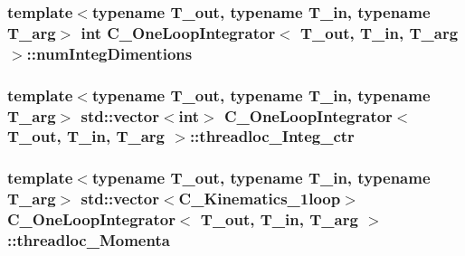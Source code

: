 \hypertarget{class_c___one_loop_integrator_aed8066a37eaa0865bd484ffd18884abb}{
\subsubsection[{num\-Integ\-Dimentions}]{\setlength{\rightskip}{0pt plus 5cm}template$<$typename T\-\_\-out, typename T\-\_\-in, typename T\-\_\-arg$>$ int {\bf C\-\_\-\-One\-Loop\-Integrator}$<$ T\-\_\-out, T\-\_\-in, T\-\_\-arg $>$\-::num\-Integ\-Dimentions\hspace{0.3cm}{\ttfamily [protected]}}}\label{class_c___one_loop_integrator_aed8066a37eaa0865bd484ffd18884abb}
\hypertarget{class_c___one_loop_integrator_a78ea7c4afee6c20ed50e6fa171a47dc3}{
\subsubsection[{threadloc\-\_\-\-Integ\-\_\-ctr}]{\setlength{\rightskip}{0pt plus 5cm}template$<$typename T\-\_\-out, typename T\-\_\-in, typename T\-\_\-arg$>$ std\-::vector$<$int$>$ {\bf C\-\_\-\-One\-Loop\-Integrator}$<$ T\-\_\-out, T\-\_\-in, T\-\_\-arg $>$\-::threadloc\-\_\-\-Integ\-\_\-ctr\hspace{0.3cm}{\ttfamily [protected]}}}\label{class_c___one_loop_integrator_a78ea7c4afee6c20ed50e6fa171a47dc3}
\hypertarget{class_c___one_loop_integrator_a767bf7500b35433779ed8b2fdb5b73a7}{
\subsubsection[{threadloc\-\_\-\-Momenta}]{\setlength{\rightskip}{0pt plus 5cm}template$<$typename T\-\_\-out, typename T\-\_\-in, typename T\-\_\-arg$>$ std\-::vector$<${\bf C\-\_\-\-Kinematics\-\_\-1loop}$>$ {\bf C\-\_\-\-One\-Loop\-Integrator}$<$ T\-\_\-out, T\-\_\-in, T\-\_\-arg $>$\-::threadloc\-\_\-\-Momenta\hspace{0.3cm}{\ttfamily [protected]}}}\label{class_c___one_loop_integrator_a767bf7500b35433779ed8b2fdb5b73a7}


